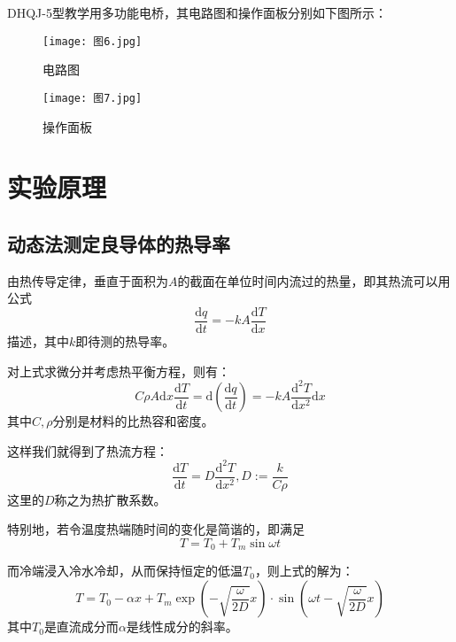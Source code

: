 \documentclass[11pt]{article}
\begin{document}
DHQJ-5型教学用多功能电桥，其电路图和操作面板分别如下图所示：

\begin{figure}[H]
  \begin{minipage}[t]{0.6\linewidth}
      \centering
      \texttt{[image: 图6.jpg]}
      \caption{电路图}
  \end{minipage}
  \begin{minipage}[t]{0.39\linewidth}
      \centering
      \texttt{[image: 图7.jpg]}
      \caption{操作面板}
  \end{minipage}
\end{figure}

\section{实验原理}

\subsection{动态法测定良导体的热导率}

由热传导定律，垂直于面积为$A$的截面在单位时间内流过的热量，即其热流可以用公式\begin{displaymath}\frac{\mathrm{d}q}{\mathrm{d}t}=-kA\frac{\mathrm{d}T}{\mathrm{d}x}\end{displaymath}描述，其中$k$即待测的热导率。

对上式求微分并考虑热平衡方程，则有：\begin{displaymath}C\rho A\mathrm{d}x\frac{\mathrm{d}T}{\mathrm{d}t}=\mathrm{d}\left(\frac{\mathrm{d}q}{\mathrm{d}t}\right)=-kA\frac{\mathrm{d}^2 T}{\mathrm{d} x^2}\mathrm{d}x\end{displaymath} 
其中$C,\rho$分别是材料的比热容和密度。

这样我们就得到了热流方程：\begin{displaymath}\frac{\mathrm{d}T}{\mathrm{d}t}=D\frac{\mathrm{d}^2 T}{\mathrm{d}x^2},D:=\frac{k}{C\rho}\end{displaymath}
这里的$D$称之为热扩散系数。

特别地，若令温度热端随时间的变化是简谐的，即满足\begin{displaymath}T=T_0+T_m\sin \omega t\end{displaymath}

而冷端浸入冷水冷却，从而保持恒定的低温$T_0$，则上式的解为：\begin{displaymath}T=T_0-\alpha x+T_m\exp \left(-\sqrt{\frac{\omega}{2D}}x\right)\cdot \sin \left(\omega t-\sqrt{\frac{\omega}{2D}}x\right)\end{displaymath}其中$T_0$是直流成分而$\alpha$是线性成分的斜率。
\end{document}
